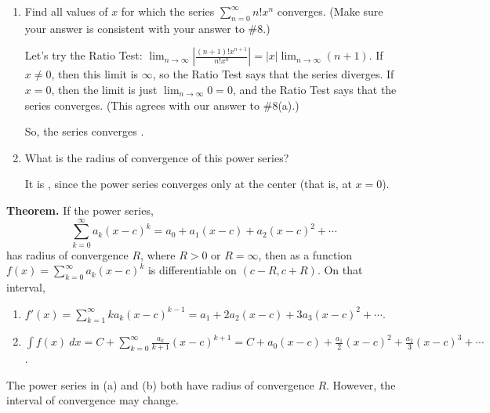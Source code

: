 \documentclass[main]{subfiles}
\begin{document}
\begin{enumerate}
\begin{enumerate}
  \item
  \begin{problem}[0.5in]
  Find all values of $x$ for which the series $\displaystyle
  \sum_{n=0}^\infty n! x^n$ converges.  (Make sure your answer is
  consistent with your answer to
  {\#8}.)
  \end{problem}

  \begin{solution}
  Let's try the Ratio Test: $\displaystyle \lim_{n \to \infty} \left|
  \frac{(n + 1)! x^{n+1}}{n! x^n} \right| = |x| \lim_{n \to \infty}
  (n + 1)$.  If $x \neq 0$, then this limit is $\infty$, so the Ratio
  Test says that the series diverges.  If $x = 0$, then the limit is
  just $\displaystyle \lim_{n \to \infty} 0 = 0$, and the Ratio Test
  says that the series converges.  (This agrees with our answer to
  {{\#8}(a)}.)

  So, the series converges .
  \end{solution}

  \item
  \begin{problem}
  What is the radius of convergence of this power series?      
  \end{problem}

  \begin{solution}
  It is , since the power series converges only at the center
  (that is, at $x = 0$).
  \end{solution}

  
\end{enumerate}
  \fi





 \begin{problemonly} 
  \begin{framed}
  \textbf{Theorem.} If the power series, \[\displaystyle \sum_{k=0}^\infty
  a_k (x - c)^k = a_0 + a_1 (x - c) + a_2 (x - c)^2 + \cdots\] has radius
  of convergence $R$, where $R > 0$ or $R = \infty$, then as a function
  $f(x) = \displaystyle \sum_{k=0}^\infty a_k (x - c)^k$ is differentiable on $(c - R, c + R)$.
  On that interval,
  \begin{enumerate}[topsep=0pt,itemsep=0pt]
  \item $\displaystyle f'(x) = \sum_{k=1}^\infty k a_k (x - c)^{k-1} =
  a_1 + 2 a_2 (x - c) + 3 a_3 (x - c)^2 + \cdots$. 
  \item $\displaystyle \int f(x)~dx = C + \sum_{k=0}^\infty
  \frac{a_k}{k + 1} (x - c)^{k + 1} = C + a_0 (x - c) + \frac{a_1}{2}
  (x - c)^2 + \frac{a_2}{3} (x - c)^3 + \cdots$.
\end{enumerate}
The power series in (a) and (b) both have radius of convergence $R$.
However, the interval of convergence may change.
\end{framed}
\end{problemonly}
\pspace{\newpage}


\end{enumerate}
\end{document}
